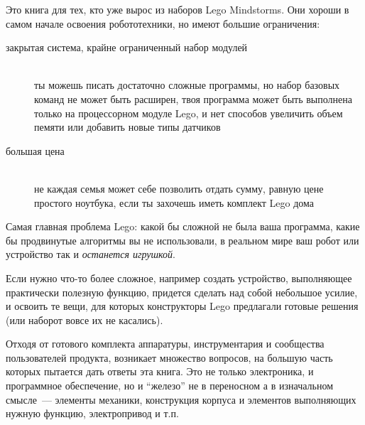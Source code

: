 \secdown

\noindent
Это книга для тех, кто уже вырос из наборов Lego Mindstorms.
Они хороши в самом начале освоения робототехники, но имеют большие
ограничения:

\begin{description}

\item[закрытая система, крайне ограниченный набор модулей]\ \\ты можешь писать
достаточно сложные программы, но набор базовых команд не может быть расширен,
твоя программа может быть выполнена только на процессорном модуле Lego, и нет
способов увеличить объем пемяти или добавить новые типы датчиков

\item[большая цена]\ \\не каждая семья может себе позволить отдать сумму,
равную цене простого ноутбука, если ты захочешь иметь комплект Lego дома

\end{description}
\clearpage

Самая главная проблема Lego: какой бы сложной не была ваша программа, какие бы
продвинутые алгоритмы вы не использовали, в реальном мире ваш робот или
устройство так и \textit{останется игрушкой}.


Если нужно что-то более сложное, например создать устройство, выполняющее
практически полезную функцию, придется сделать над собой небольшое усилие, и
освоить те вещи, для которых конструкторы Lego предлагали готовые решения (или
наборот вовсе их не касались).

Отходя от готового комплекта аппаратуры, инструментария и сообщества
пользователей продукта, возникает множество вопросов, на большую часть которых
пытается дать ответы эта книга. Это не только электроника, и программное
обеспечение, но и ``железо'' не в переносном а в изначальном смысле\ ---
элементы механики, конструкция корпуса и элементов выполняющих нужную функцию,
электропривод и т.п. 

\secup
